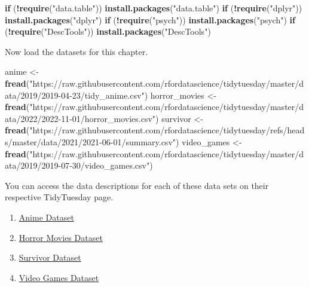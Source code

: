 \documentclass[
]{book}
\newenvironment{Shaded}{\begin{snugshade}}{\end{snugshade}}
\newcommand{\ControlFlowTok}[1]{\textcolor[rgb]{0.13,0.29,0.53}{\textbf{#1}}}
\newcommand{\FunctionTok}[1]{\textcolor[rgb]{0.13,0.29,0.53}{\textbf{#1}}}
\newcommand{\NormalTok}[1]{#1}
\newcommand{\OtherTok}[1]{\textcolor[rgb]{0.56,0.35,0.01}{#1}}
\newcommand{\SpecialCharTok}[1]{\textcolor[rgb]{0.81,0.36,0.00}{\textbf{#1}}}
\newcommand{\StringTok}[1]{\textcolor[rgb]{0.31,0.60,0.02}{#1}}
\providecommand{\tightlist}{%
  \setlength{\itemsep}{0pt}\setlength{\parskip}{0pt}}
\begin{document}
\begin{Shaded}
\begin{Highlighting}[]
\ControlFlowTok{if}\NormalTok{ (}\SpecialCharTok{!}\FunctionTok{require}\NormalTok{(}\StringTok{"data.table"}\NormalTok{)) }\FunctionTok{install.packages}\NormalTok{(}\StringTok{"data.table"}\NormalTok{)}
\ControlFlowTok{if}\NormalTok{ (}\SpecialCharTok{!}\FunctionTok{require}\NormalTok{(}\StringTok{"dplyr"}\NormalTok{)) }\FunctionTok{install.packages}\NormalTok{(}\StringTok{"dplyr"}\NormalTok{)}
\ControlFlowTok{if}\NormalTok{ (}\SpecialCharTok{!}\FunctionTok{require}\NormalTok{(}\StringTok{"psych"}\NormalTok{)) }\FunctionTok{install.packages}\NormalTok{(}\StringTok{"psych"}\NormalTok{)}
\ControlFlowTok{if}\NormalTok{ (}\SpecialCharTok{!}\FunctionTok{require}\NormalTok{(}\StringTok{"DescTools"}\NormalTok{)) }\FunctionTok{install.packages}\NormalTok{(}\StringTok{"DescTools"}\NormalTok{)}
\end{Highlighting}
\end{Shaded}

Now load the datasets for this chapter.

\begin{Shaded}
\begin{Highlighting}[]
\NormalTok{anime }\OtherTok{\textless{}{-}} \FunctionTok{fread}\NormalTok{(}\StringTok{"https://raw.githubusercontent.com/rfordatascience/tidytuesday/master/data/2019/2019{-}04{-}23/tidy\_anime.csv"}\NormalTok{)}
\NormalTok{horror\_movies }\OtherTok{\textless{}{-}} \FunctionTok{fread}\NormalTok{(}\StringTok{"https://raw.githubusercontent.com/rfordatascience/tidytuesday/master/data/2022/2022{-}11{-}01/horror\_movies.csv"}\NormalTok{)}
\NormalTok{survivor }\OtherTok{\textless{}{-}} \FunctionTok{fread}\NormalTok{(}\StringTok{"https://raw.githubusercontent.com/rfordatascience/tidytuesday/refs/heads/master/data/2021/2021{-}06{-}01/summary.csv"}\NormalTok{)}
\NormalTok{video\_games }\OtherTok{\textless{}{-}} \FunctionTok{fread}\NormalTok{(}\StringTok{"https://raw.githubusercontent.com/rfordatascience/tidytuesday/master/data/2019/2019{-}07{-}30/video\_games.csv"}\NormalTok{)}
\end{Highlighting}
\end{Shaded}

You can access the data descriptions for each of these data sets on their respective TidyTuesday page.

\begin{enumerate}
\def\labelenumi{\arabic{enumi}.}
\tightlist
\item
  \href{https://github.com/rfordatascience/tidytuesday/blob/master/data/2019/2019-04-23/readme.md}{Anime Dataset}
\item
  \href{https://github.com/rfordatascience/tidytuesday/blob/master/data/2022/2022-11-01/readme.md}{Horror Movies Dataset}
\item
  \href{https://github.com/rfordatascience/tidytuesday/tree/master/data/2021/2021-06-01}{Survivor Dataset}
\item
  \href{https://github.com/rfordatascience/tidytuesday/blob/master/data/2019/2019-07-30//readme.md}{Video Games Dataset}
\end{enumerate}
\end{document}
